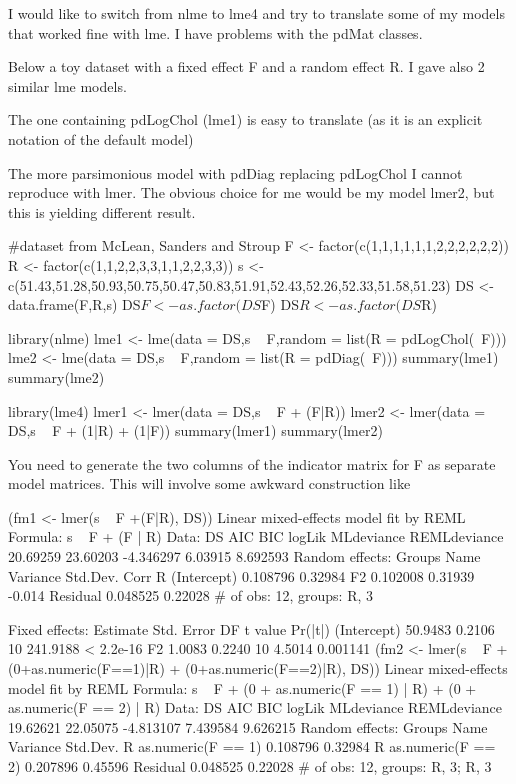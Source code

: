 


 I would like to switch from nlme to lme4 and try to translate some of my
 models that worked fine with lme.
 I have problems with the pdMat classes.

 Below a toy dataset with a fixed effect F and a random effect R. I gave
 also 2 similar lme models.

 The one containing pdLogChol (lme1) is easy to translate (as it is an
 explicit notation of the default model)


 The more parsimonious model with pdDiag replacing pdLogChol I cannot
 reproduce with lmer. The obvious choice for me would be my model lmer2,
 but this is yielding different result.



 #dataset from McLean, Sanders and Stroup
 F <- factor(c(1,1,1,1,1,1,2,2,2,2,2,2))
 R <- factor(c(1,1,2,2,3,3,1,1,2,2,3,3))
 s <-
 c(51.43,51.28,50.93,50.75,50.47,50.83,51.91,52.43,52.26,52.33,51.58,51.23)
 DS <- data.frame(F,R,s)
 DS$F <- as.factor(DS$F)
 DS$R <- as.factor(DS$R)

 library(nlme)
 lme1 <- lme(data = DS,s ~ F,random = list(R = pdLogChol(~F)))
 lme2 <- lme(data = DS,s ~ F,random = list(R = pdDiag(~F)))
 summary(lme1)
 summary(lme2)

 library(lme4)
 lmer1 <- lmer(data = DS,s ~ F + (F|R))
 lmer2 <- lmer(data = DS,s ~ F + (1|R) + (1|F))
 summary(lmer1)
 summary(lmer2)

You need to generate the two columns of the indicator matrix for F as
separate model matrices.  This will involve some awkward construction
like

 (fm1 <- lmer(s ~ F +(F|R), DS))
Linear mixed-effects model fit by REML
Formula: s ~ F + (F | R)
   Data: DS
      AIC      BIC    logLik MLdeviance REMLdeviance
 20.69259 23.60203 -4.346297    6.03915     8.692593
Random effects:
 Groups   Name        Variance Std.Dev. Corr
 R        (Intercept) 0.108796 0.32984
          F2          0.102008 0.31939  -0.014
 Residual             0.048525 0.22028
# of obs: 12, groups: R, 3

Fixed effects:
            Estimate Std. Error DF  t value  Pr(|t|)
(Intercept)  50.9483     0.2106 10 241.9188 < 2.2e-16
F2            1.0083     0.2240 10   4.5014  0.001141
 (fm2 <- lmer(s ~ F + (0+as.numeric(F==1)|R) + (0+as.numeric(F==2)|R), DS))
Linear mixed-effects model fit by REML
Formula: s ~ F + (0 + as.numeric(F == 1) | R) + (0 + as.numeric(F ==
2) |      R)
   Data: DS
      AIC      BIC    logLik MLdeviance REMLdeviance
 19.62621 22.05075 -4.813107   7.439584     9.626215
Random effects:
 Groups   Name               Variance Std.Dev.
 R        as.numeric(F == 1) 0.108796 0.32984
 R        as.numeric(F == 2) 0.207896 0.45596
 Residual                    0.048525 0.22028
# of obs: 12, groups: R, 3; R, 3

